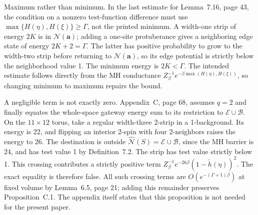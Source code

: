 \documentclass[10pt]{article}
\begin{document}
Maximum rather than minimum. In the last estimate for Lemma 7.16, page 43, the condition on a nonzero test-function difference must use \(\max\{H(\eta),H(\xi)\}\geq\Gamma\), not the printed minimum. A width-one strip of energy \(2K\) is in \(\mathcal N(\mathbf a)\); adding a one-site protuberance gives a neighboring edge state of energy \(2K+2=\Gamma\). The latter has positive probability to grow to the width-two strip before returning to \(\mathcal N(\mathbf a)\), so its edge potential is strictly below the neighborhood value 1. The minimum energy is \(2K<\Gamma\). The intended estimate follows directly from the MH conductance \(Z_\beta^{-1}e^{-\beta\max(H(\eta),H(\xi))}\), so changing minimum to maximum repairs the bound.\par
A negligible term is not exactly zero. Appendix C, page 68, assumes \(q=2\) and finally equates the whole-space gateway energy sum to its restriction to \(\mathcal E\cup\mathcal B\). On the \(11\times12\) torus, take a regular width-three 2-strip in a 1-background. Its energy is 22, and flipping an interior 2-spin with four 2-neighbors raises the energy to 26. The destination is outside \(\widehat{\mathcal N}(S)=\mathcal E\cup\mathcal B\), since the MH barrier is 24, and has test value 1 by Definition 7.2. The strip has test value strictly below 1. This crossing contributes a strictly positive term \(Z_\beta^{-1}e^{-26\beta}(1-\widetilde h(\eta))^2\). The exact equality is therefore false. All such crossing terms are \(O(e^{-(\Gamma+1)\beta})\) at fixed volume by Lemma 6.5, page 21; adding this remainder preserves Proposition C.1. The appendix itself states that this proposition is not needed for the present paper.\par
\end{document}
